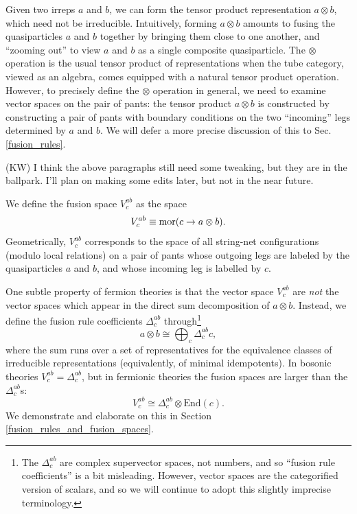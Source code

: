 \documentclass[12pt,a4paper]{article}
\newcounter{arrow}
\newcommand{\tp}{\otimes}
\newcommand{\ra}{\rightarrow}
\newcommand\be            {\begin{equation}}
\newcommand\ee            {\end{equation}}
\newcommand{\End}{\text{End}}
\newcommand{\kw}[1]{{\color{kwcolor}\footnotesize{(KW) #1}}}
\begin{document}
Given two irreps $a$ and $b$, we can form the tensor product representation $a\tp b$, which need not be irreducible.
Intuitively, forming $a\tp b$ amounts to fusing the quasiparticles $a$ and $b$ together by bringing them close 
to one another, and ``zooming out'' to view $a$ and $b$ as a single composite quasiparticle. 
The $\tp$ operation is the usual tensor product of representations when the tube category, viewed as an algebra, 
comes equipped with a natural tensor product operation. 
However, to precisely define the $\tp$ operation in general, we need to examine vector spaces on the pair of 
pants: the tensor product $a \tp b$ is constructed by constructing a pair of pants with 
boundary conditions on the two ``incoming'' legs determined by $a$ and $b$.
We will defer a more precise discussion of this to Sec. \ref{fusion_rules}. 

\kw{I think the above paragraphs still need some tweaking, but they are in the ballpark.
I'll plan on making some edits later, but not in the near future.}

We define the fusion space $V^{ab}_c$ as the space
\be V^{ab}_c \equiv {\rm mor}(c \ra a \tp b).\ee
Geometrically, $V^{ab}_c$ corresponds to the space of all string-net configurations (modulo local relations) 
on a pair of pants whose outgoing legs are labeled by the quasiparticles $a$ and $b$, and whose incoming leg is labelled by $c$. 

One subtle property of fermion theories is that the vector space $V^{ab}_c$ are {\it not} 
the vector spaces which appear in the direct sum decomposition of $a\tp b$. 
Instead, we define the fusion rule coefficients $\Delta^{ab}_c$ through\footnote{The $\Delta^{ab}_c$ are 
complex supervector spaces, not numbers, and so ``fusion rule coefficients'' is a bit misleading. 
However, vector spaces are the categorified version of scalars, and so we will continue to adopt 
this slightly imprecise terminology.}
\be \label{fusion_coeffs_defn} 
	a \tp b \cong \bigoplus_c \Delta^{ab}_ c c,
\ee
where the sum runs over a set of representatives for the equivalence classes of irreducible 
representations (equivalently, of minimal idempotents). 
In bosonic theories $V^{ab}_c = \Delta^{ab}_c$, but in fermionic theories the fusion spaces 
are larger than the $\Delta^{ab}_c$s:
\be V^{ab}_c \cong \Delta^{ab}_c \tp \End(c).\ee
We demonstrate and elaborate on this in Section \ref{fusion_rules_and_fusion_spaces}. 
\end{document}
